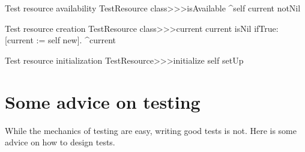 \documentclass[a4paper,10pt,twoside]{book}
\begin{document}
{
\begin{method}[testresourceisavailable]{Test resource availability}
TestResource class>>>isAvailable
	^self current notNil
\end{method}
\begin{method}[testresourcecurrent]{Test resource creation}
TestResource class>>>current
	current isNil ifTrue: [current := self new].
	^current
\end{method}
\begin{method}[restresourceinitialize]{Test resource initialization}
TestResource>>>initialize
	self setUp
\end{method}
\section{Some advice on testing}

While the mechanics of testing are easy, writing good tests is not.
Here is some advice on how to design tests.

\begin{description}



\end{description}}
\end{document}

